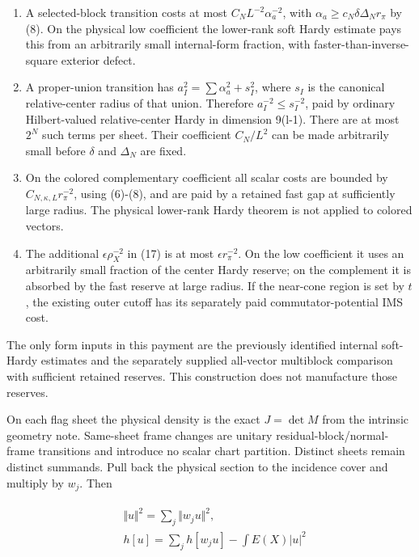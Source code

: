 \begin{enumerate}
\def\labelenumi{\arabic{enumi}.}
\tightlist
\item
  A selected-block transition costs at most
  \(C_{N} L^{-2} \alpha _{a}^{-2}\), with
  \(\alpha _{a}\ge c_{N} \delta  \Delta _{N} r_{\pi}\) by (8). On the
  physical low coefficient the lower-rank soft Hardy estimate pays this
  from an arbitrarily small internal-form fraction, with
  faster-than-inverse-square exterior defect.
\item
  A proper-union transition has
  \(a_{I}^{2}=\sum  \alpha _{a}^{2}+s_{I}^{2}\), where \(s_{I}\) is the
  canonical relative-center radius of that union. Therefore
  \(a_{I}^{-2}\le s_{I}^{-2}\), paid by ordinary Hilbert-valued
  relative-center Hardy in dimension 9(l-1). There are at most \(2^{N}\)
  such terms per sheet. Their coefficient \(C_{N}/L^{2}\) can be made
  arbitrarily small before \(\delta\) and \(\Delta _{N}\) are fixed.
\item
  On the colored complementary coefficient all scalar costs are bounded
  by \(C_{N,\kappa ,L} r_{\pi}^{-2}\), using (6)-(8), and are paid by a
  retained fast gap at sufficiently large radius. The physical
  lower-rank Hardy theorem is not applied to colored vectors.
\item
  The additional \(\epsilon  \rho _{X}^{-2}\) in (17) is at most
  \(\epsilon  r_{\pi}^{-2}\). On the low coefficient it uses an
  arbitrarily small fraction of the center Hardy reserve; on the
  complement it is absorbed by the fast reserve at large radius. If the
  near-cone region is set by \(t\), the existing outer cutoff has its
  separately paid commutator-potential IMS cost.
\end{enumerate}

The only form inputs in this payment are the previously identified
internal soft-Hardy estimates and the separately supplied all-vector
multiblock comparison with sufficient retained reserves. This
construction does not manufacture those reserves.

On each flag sheet the physical density is the exact \(J=\det  M\) from
the intrinsic geometry note. Same-sheet frame changes are unitary
residual-block/normal-frame transitions and introduce no scalar chart
partition. Distinct sheets remain distinct summands. Pull back the
physical section to the incidence cover and multiply by \(w_{j}\). Then

\begin{gather*}
\begin{aligned}
& \Vert u\Vert ^{2}=\sum _{j} \Vert w_{j} u\Vert ^{2}, \\
& h[u]=\sum _{j} h[w_{j} u]-\int  E(X)\vert u\vert ^{2}
\end{aligned}\tag{19}
\end{gather*}

